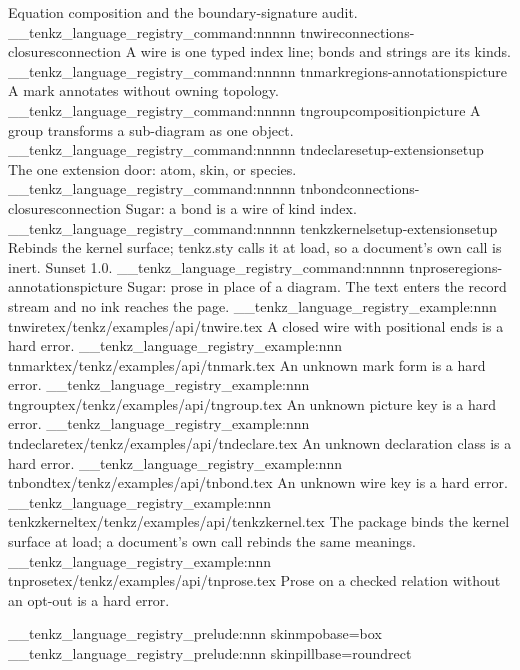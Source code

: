   {Equation composition and the boundary-signature audit.}
\__tenkz_language_registry_command:nnnnn {tnwire}{connections-closures}{connection}
  {}{A wire is one typed index line; bonds and strings are its kinds.}
\__tenkz_language_registry_command:nnnnn {tnmark}{regions-annotations}{picture}
  {}{A mark annotates without owning topology.}
\__tenkz_language_registry_command:nnnnn {tngroup}{composition}{picture}
  {}{A group transforms a sub-diagram as one object.}
\__tenkz_language_registry_command:nnnnn {tndeclare}{setup-extension}{setup}
  {}{The one extension door: atom, skin, or species.}
\__tenkz_language_registry_command:nnnnn {tnbond}{connections-closures}{connection}
  {}{Sugar: a bond is a wire of kind index.}
\__tenkz_language_registry_command:nnnnn {tenkzkernel}{setup-extension}{setup}
  {\tenkzkernel}{Rebinds the kernel surface; tenkz.sty calls it at load, so a document's own call is inert. Sunset 1.0.}
\__tenkz_language_registry_command:nnnnn {tnprose}{regions-annotations}{picture}
  {}{Sugar: prose in place of a diagram. The text enters the record stream and no ink reaches the page.}
\__tenkz_language_registry_example:nnn {tnwire}{tex/tenkz/examples/api/tnwire.tex}
  {A closed wire with positional ends is a hard error.}
\__tenkz_language_registry_example:nnn {tnmark}{tex/tenkz/examples/api/tnmark.tex}
  {An unknown mark form is a hard error.}
\__tenkz_language_registry_example:nnn {tngroup}{tex/tenkz/examples/api/tngroup.tex}
  {An unknown picture key is a hard error.}
\__tenkz_language_registry_example:nnn {tndeclare}{tex/tenkz/examples/api/tndeclare.tex}
  {An unknown declaration class is a hard error.}
\__tenkz_language_registry_example:nnn {tnbond}{tex/tenkz/examples/api/tnbond.tex}
  {An unknown wire key is a hard error.}
\__tenkz_language_registry_example:nnn {tenkzkernel}{tex/tenkz/examples/api/tenkzkernel.tex}
  {The package binds the kernel surface at load; a document's own call rebinds the same meanings.}
\__tenkz_language_registry_example:nnn {tnprose}{tex/tenkz/examples/api/tnprose.tex}
  {Prose on a checked relation without an opt-out is a hard error.}

\__tenkz_language_registry_prelude:nnn {skin}{mpo}{base=box}
\__tenkz_language_registry_prelude:nnn {skin}{pill}{base=roundrect}


